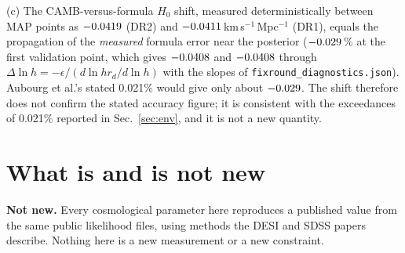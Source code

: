 \documentclass[11pt]{article}
\newcommand{\kms}{km\,s$^{-1}$\,Mpc$^{-1}$}
\begin{document}
(c) The CAMB-versus-formula $H_0$ shift, measured deterministically between MAP points as $-0.0419$ (DR2) and $-0.0411$\,\kms{} (DR1), equals the
propagation of the \emph{measured} formula error near the posterior ($-0.029$\,\% at the first validation point, which gives $-0.0408$ and $-0.0408$ through
$\Delta\ln h=-\epsilon/(d\ln hr_d/d\ln h)$ with the slopes of \texttt{fixround\_diagnostics.json}). Aubourg et al.'s stated 0.021\% would give only about $-0.029$.
The shift therefore does not confirm the stated accuracy figure; it is consistent with the exceedances of 0.021\% reported in Sec.~\ref{sec:env}, and it is not a new quantity.
\begin{table}[h]\centering\small\caption{Derived quantities.}\label{tab:derived}
\resizebox{\textwidth}{!}{}\end{table}

\begin{table}[h]\centering\small\caption{Dual-environment Lean check (\texttt{results/cosmo\_synthesis/lean\_dual\_check.json}, revision~2 of the checker). ``\#print axioms'' counts
commands in comment-stripped source. Wall times are single measurements on a shared machine.}\label{tab:lean}
\resizebox{\textwidth}{!}{}\end{table}
\begin{table}[h]\centering\small\caption{Elenchus ledgers. ``A audited (model)'' counts Tier~A rows whose audit is a non-empty object naming an auditor (all are model referees).
``Audit hash = current file'' counts those audits whose recorded source sha256 equals the current Lean file. rc is the
gate exit code (DR1: from the DR2 run's parent-ledger control). Tier~B here means a seeded floating-point harness on sha256-verified inputs; Elenchus's own Tier~B is exact
$\mathbb{Q}/\mathbb{Z}$ arithmetic and would file these rows at X (Sec.~\ref{sec:ledger}).}\label{tab:ledger}
\resizebox{\textwidth}{!}{}\end{table}

\section{What is and is not new}\label{sec:new}
\textbf{Not new.} Every cosmological parameter here reproduces a published value from the same public likelihood files, using methods
the DESI and SDSS papers describe. Nothing here is a new measurement or a new constraint.
\end{document}
